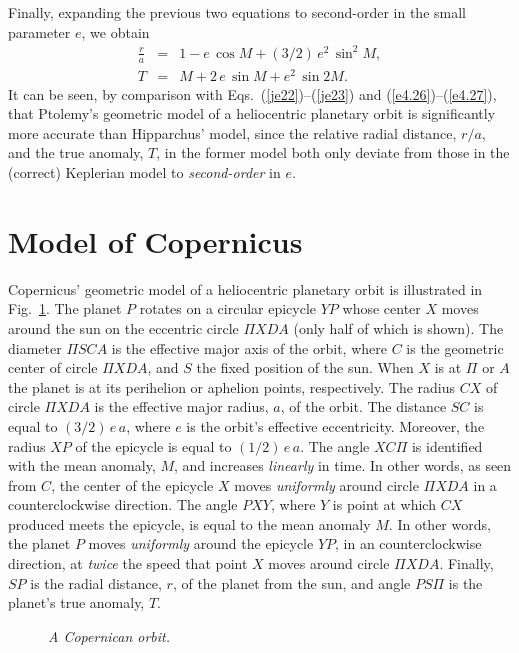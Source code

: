 Finally, expanding the previous two equations to second-order in the small parameter $e$, we obtain
\begin{eqnarray}
\frac{r}{a} &=& 1 -e\,\cos M + (3/2)\,e^2\,\sin^2 M,\label{e4.30}\\[0.5ex]
T &=& M + 2\,e\,\sin M + e^2\,\sin 2M.\label{e4.31}
\end{eqnarray}
It can be seen, by comparison with Eqs.~(\ref{je22})--(\ref{je23}) and (\ref{e4.26})--(\ref{e4.27}), that   Ptolemy's geometric model of a heliocentric planetary orbit is significantly
more accurate than  Hipparchus' model, since the 
relative radial distance, $r/a$,  and the true anomaly, $T$, in the former model both only deviate from those in the (correct) Keplerian model to {\em second-order}\/ in $e$.

\section{Model of Copernicus}
Copernicus' geometric model of  a heliocentric planetary orbit is illustrated  in Fig.~\ref{cop}. 
The planet $P$ rotates on a circular epicycle $YP$ whose center $X$ moves around the sun on the eccentric circle $\Pi X D A$ (only
half of which is shown). The diameter $\Pi S C A$ is the effective major axis of the orbit, where $C$ is the geometric center of circle $\Pi X D A$,  and $S$ the fixed position of the sun. When $X$ is at  $\Pi$ or $A$ the planet is at its perihelion
or aphelion points, respectively.  The radius $CX$ of circle $\Pi XDA$ is   the effective major radius, $a$, of the orbit.  The distance $SC$ is
equal to $(3/2)\,e\,a$, where $e$ is the orbit's effective eccentricity. Moreover, the radius $XP$ of the epicycle is equal to $(1/2)\,e\,a$. 
The angle $XC\Pi$
is  identified with the  mean anomaly, $M$, and increases {\em linearly}\/  in time.  In other words, as seen from $C$, the center of
the epicycle
$X$ moves {\em uniformly}\/ around circle $\Pi XDA$ in a counterclockwise direction. The angle $PXY$, where $Y$ is
point at which $CX$ produced meets the epicycle,  is equal to
the mean anomaly $M$. In other words, the planet $P$ moves {\em uniformly}\/ around the epicycle $YP$, in an counterclockwise direction, at {\em twice}\/
the speed that point $X$ moves around circle $\Pi XDA$.
 Finally, $SP$ is the radial
distance, $r$, of the planet from the sun, and angle $P S \Pi$ is the planet's true anomaly, $T$.

\begin{figure}[h]
\epsfysize=3in
\centerline{}
\caption{\em A Copernican orbit.}\label{cop}
\end{figure}

